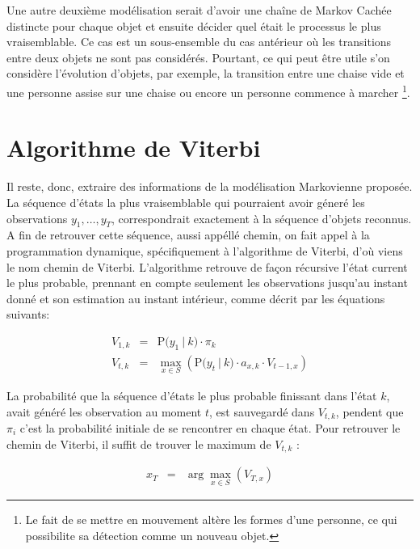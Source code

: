 Une autre deuxième modélisation serait d'avoir une chaîne de Markov
Cachée distincte pour chaque objet et ensuite décider quel était le
processus le plus vraisemblable. Ce cas est un sous-ensemble du cas
antérieur où les transitions entre deux objets ne sont pas
considérés. Pourtant, ce qui peut être utile s'on considère
l'évolution d'objets, par exemple, la transition entre une chaise vide
et une personne assise sur une chaise ou encore un personne
commence à marcher \footnote{Le fait de se mettre en mouvement
  altère les formes d'une personne, ce qui possibilite sa détection
  comme un nouveau objet.}.

\section{Algorithme de Viterbi}

Il reste, donc, extraire des informations de la modélisation Markovienne proposée.
La séquence d'états la plus vraisemblable qui pourraient avoir géneré
les observations  $y_1,\dots, y_T$, correspondrait exactement à la séquence d'objets reconnus.
A fin de retrouver cette séquence, aussi appéllé chemin, on fait 
appel à la programmation dynamique, spécifiquement à l'algorithme de Viterbi, d'où viens le nom chemin de Viterbi.
L'algorithme retrouve de façon récursive l'état current le plus probable, 
prennant en compte seulement les observations jusqu'au instant donné et son
estimation au instant intérieur, comme décrit par les équations suivants:

\begin{equation*}
  \begin{array}{rcl}
    V_{1,k} &=& \mathrm{P}\big( y_1 \ | \ k \big) \cdot \pi_k \\
    V_{t,k} &=& \max_{x \in S} \left(  \mathrm{P}\big( y_t \ | \ k \big) \cdot a_{x,k} \cdot V_{t-1,x}\right)
  \end{array}
\end{equation*}

La probabilité que la séquence d'états le plus probable finissant dans l'état $k$, avait généré les observation au moment $t$, est sauvegardé dans $V_{t,k}$, pendent que $\pi_i$ c'est la probabilité initiale de se rencontrer en chaque état. Pour retrouver le chemin de Viterbi, il suffit de trouver le maximum de $V_{t,k}$ :

\begin{equation*}
  \begin{array}{rcl}
    x_T &=& \arg\max_{x \in S} (V_{T,x})
  \end{array}
\end{equation*}

